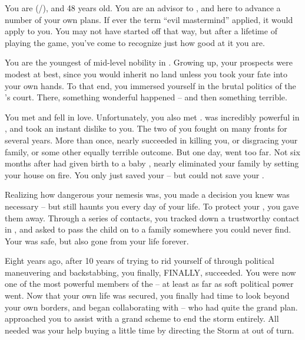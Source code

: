 \documentclass[char]{GL2020}
\begin{document}
\name{\cEvil{}}

You are \cEvil{} (\cEvil{\they}/\cEvil{\them}), and 48 years old. You are an advisor to \cQueen{\full}, and here to advance a number of your own plans. If ever the term ``evil mastermind'' applied, it would apply to you. You may not have started off that way, but after a lifetime of playing the game, you’ve come to recognize just how good at it you are.

You are the youngest \cEvil{\child} of mid-level nobility in \pFarm{}. Growing up, your prospects were modest at best, since you would inherit no land unless you took your fate into your own hands. To that end, you immersed yourself in the brutal politics of the \cQueen{\Majesty}’s court. There, something wonderful happened -- and then something terrible.

You met \cPirateChildParent{} and fell in love. Unfortunately, you also met \cEvilNemesis{}. \cEvilNemesis{} was incredibly powerful in \pFarm{}, and took an instant dislike to you. The two of you fought on many fronts for several years. More than once, \cEvilNemesis{\they} nearly succeeded in killing you, or disgracing your family, or some other equally terrible outcome. But one day, \cEvilNemesis{\they} went too far. Not six months after \cPirateChildParent{} had given birth to a baby \cPirateChild{\kid}, \cEvilNemesis{} nearly eliminated your family by setting your house on fire. You only just saved your \cPirateChild{\child} -- but could not save your \cPirateChildParent{\spouse}.

Realizing how dangerous your nemesis was, you made a decision you knew was necessary -- but still haunts you every day of your life. To protect your \cPirateChild{\child}, you gave them away. Through a series of contacts, you tracked down a trustworthy contact in \cEthics{}, and asked \cEthics{\them} to pass the child on to a family somewhere you could never find. Your \cPirateChild{\child} was safe, but \cPirateChild{\they} \cPirateChild{\were} also gone from your life forever.

Eight years ago, after 10 years of trying to rid yourself of \cEvilNemesis{} through political maneuvering and backstabbing, you finally, FINALLY, succeeded. You were now one of the most powerful members of the \pFarm{} -- at least as far as soft political power went. Now that your own life was secured, you finally had time to look beyond your own borders, and began collaborating with \cDiplomat{} -- who had quite the grand plan. \cDiplomat{\They} approached you to assist with a grand scheme to end the storm entirely. All \cDiplomat{\they} needed was your help buying a little time by directing the Storm at \pShip{} out of turn.
\end{document}

